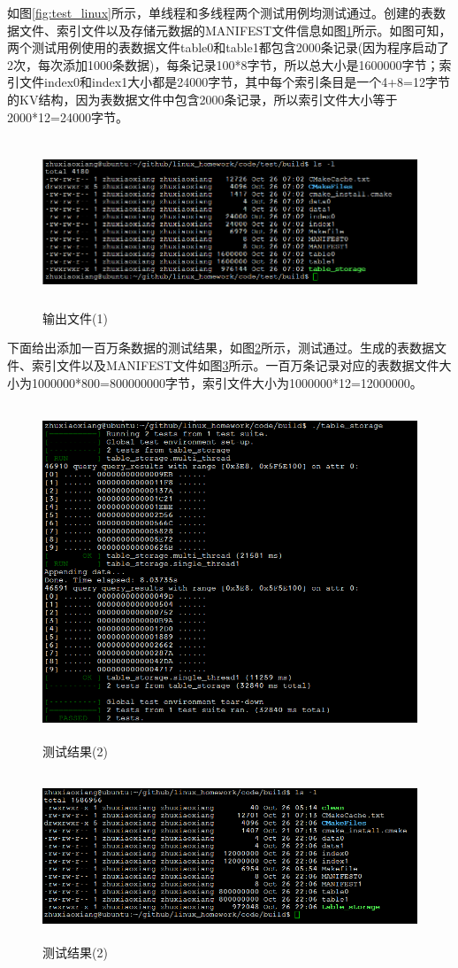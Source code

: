 \documentclass[bachelor]{thesis-uestc}
\begin{document}
如图\ref{fig:test_linux}所示，单线程和多线程两个测试用例均测试通过。创建的表数据文件、索引文件以及存储元数据的MANIFEST文件信息如图\ref{fig:test_linux_files}所示。如图可知，两个测试用例使用的表数据文件table0和table1都包含2000条记录(因为程序启动了2次，每次添加1000条数据)，每条记录100*8字节，所以总大小是1600000字节；索引文件index0和index1大小都是24000字节，其中每个索引条目是一个4+8=12字节的KV结构，因为表数据文件中包含2000条记录，所以索引文件大小等于2000*12=24000字节。
\begin{figure}[htbp]
	\centering\includegraphics[height=5cm]{images/test_linux_files.png}
	\caption{输出文件(1)}
	\label{fig:test_linux_files}
\end{figure}

下面给出添加一百万条数据的测试结果，如图\ref{fig:test_linux2}所示，测试通过。生成的表数据文件、索引文件以及MANIFEST文件如图\ref{fig:test_linux_files2}所示。一百万条记录对应的表数据文件大小为1000000*800=800000000字节，索引文件大小为1000000*12=12000000。

\begin{figure}[htbp]
	\centering\includegraphics[height=10cm]{images/test_linux2.png}
	\caption{测试结果(2)}
	\label{fig:test_linux2}
\end{figure}

\begin{figure}[htbp]
	\centering\includegraphics[height=5cm]{images/test_linux_files2.png}
	\caption{测试结果(2)}
	\label{fig:test_linux_files2}
\end{figure}
\end{document}
